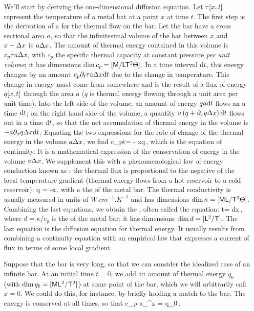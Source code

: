 We'll start by deriving the one-dimensional diffusion equation. Let $\tau\!\left[{x,t}\right]$ represent the temperature of a metal bat at a point $x$ at time $t$. The first step is the derivation of a  for the thermal flow on the bar. Let the bar have a cross sectional area $a$, so that the infinitesimal volume of the bar between $x$ and $x + \Delta x$ is $a\Delta x$. The amount of thermal energy contained in this volume is $c_p\tau a\Delta x$, with $c_p$ the specific thermal capacity at constant pressure \emph{per unit volume}; it has dimensions $\dim c_p = [\mathsf{M}/\mathsf{L}\mathsf{T}^2\Theta]$. In a time interval $\text{d} t$, this energy changes by an amount $c_p\partial_{t}\tau a\Delta x\text{d} t$ due to the change in temperature. This change in energy must come from somewhere and is the result of a flux of energy $q\!\left[{x,t}\right]$ through the area $a$ ($q$ is thermal energy flowing through a unit area per unit time). Into the left side of the volume, an amount of energy $qa\text{d} t$ flows an a time $\text{d} t$; on the right hand side of the volume, a quantity $a\left(q + \partial_{x}q \Delta x\right)\text{d} t$ flows out in a time $\text{d} t$, so that the net accumulation of thermal energy in the volume is $-a\partial_{x}q\Delta x\text{d} t$. Equating the two expressions for the rate of change of the thermal energy in the volume $a\Delta x$, we find
\beq
c_p\ipd t\tau = - \ipd xq\,,
\eeq
which is the equation of continuity. It is a mathematical expression of the conservation of energy in the volume $a\Delta x$. We supplement this with a phenomenological law of energy conduction known as : the thermal flux is proportional to the negative of the local temperature gradient (thermal energy flows from a hot reservoir to a cold reservoir):
\beq
q = -\kappa\ipd x\tau\,,
\eeq
with $\kappa$ the  of the metal bar. The thermal conductivity is usually measured in units of $\si{W.cm^{-1}.K^{-1}}$ and has dimensions $\dim\kappa = [\mathsf{M}\mathsf{L}/\mathsf{T}^3\Theta]$. Combining the last equations, we obtain the , often called the  equation:
\beq
\ipd t\tau = d\tau x\,,
\eeq
where $d = \kappa/c_p$ is the  of the metal bar; it has dimensions $\dim d = [\mathsf{L}^2/\mathsf{T}]$. The last equation is the diffusion equation for thermal energy. It usually results from combining a continuity equation with an empirical law that expresses a current of flux in terms of some local gradient.

Suppose that the bar is very long, so that we can consider the idealized case of an infinite bar. At an initial time $t = 0$, we add an amount of thermal energy $q_0$ (with $\dim q_0 = [\mathsf{M}\mathsf{L}^2/\mathsf{T}^2]$) at some point of the bar, which we will arbitrarily call $x = 0$. We could do this, for instance, by briefly holding a match to the bar. The energy is conserved at all times, so that
\beq
c_p a\int_\infty^\infty \tau{}\dx x = q_0\,.
\eeq

